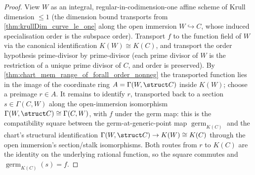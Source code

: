 \begin{proof}
        \leanok
  View \(W\) as an integral, regular-in-codimension-one affine scheme of Krull
  dimension \(\le 1\) (the dimension bound transports from
  \cref{thm:krullDim_curve_le_one} along the open immersion \(W \hookrightarrow
  C\), whose induced specialisation order is the subspace order). Transport \(f\)
  to the function field of \(W\) via the canonical identification \(K(W) \cong
  K(C)\), and transport the order hypothesis prime-divisor by prime-divisor
  (each prime divisor of \(W\) is the restriction of a unique prime divisor of
  \(C\), and order is preserved). By
  \cref{thm:chart_mem_range_of_forall_order_nonneg} the transported function lies
  in the image of the coordinate ring \(A = \Gamma(W, \struct C)\) inside
  \(K(W)\); choose a preimage \(r \in A\). It remains to identify \(r\),
  transported back to a section \(s \in \Gamma(C, W)\) along the open-immersion
  isomorphism \(\Gamma(W, \struct C) \cong \Gamma(C, W)\), with \(f\) under the
  germ map: this is the compatibility square between the germ-at-generic-point
  map \(\operatorname{germ}_{K(C)}\) and the chart's structural identification
  \(\Gamma(W,\struct C) \to K(W) \cong K(C)\) through the open immersion's
  section/stalk isomorphisms. Both routes from \(r\) to \(K(C)\) are the
  identity on the underlying rational function, so the square commutes and
  \(\operatorname{germ}_{K(C)}(s) = f\).
\end{proof}



